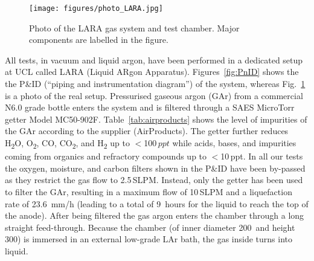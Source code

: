 \documentclass[a4paper,11pt]{article}
\begin{document}
\begin{figure}[tb]
	\begin{center}
	\texttt{[image: figures/photo\_LARA.jpg]}			
	\caption{Photo of the LARA gas system and test chamber. Major components are labelled in the figure.}
	\label{fig:photo_LARA}
	\end{center}
\end{figure}

All tests, in vacuum and liquid argon, have been performed in a dedicated setup at UCL called LARA (Liquid ARgon Apparatus).
Figures~\ref{fig:PnID} shows the the P\&ID (``piping and instrumentation diagram'') of the system, whereas Fig.~\ref{fig:photo_LARA} is a photo of the real setup. Pressurised gaseous argon (GAr) from a commercial N6.0 grade bottle enters the system and is filtered through a SAES MicroTorr getter Model MC50-902F. Table~\ref{tab:airproducts} shows the level of impurities of the GAr according to the supplier (AirProducts). The getter further reduces H\textsubscript{2}O, O\textsubscript{2}, CO, CO\textsubscript{2}, and H\textsubscript{2} up to $<$100\,$ppt$ while acids, bases, and impurities coming from organics and refractory compounds up to $<$10\,ppt. In all our tests the oxygen, moisture, and carbon filters shown in the P\&ID have been by-passed as they restrict the gas flow to 2.5\,SLPM. Instead, only the getter has been used to filter the GAr, resulting in a maximum flow of 10\,SLPM and a liquefaction rate of \SI{23.6}{mm/h} (leading to a total of \SI{9}{hours} for the liquid to reach the top of the anode).
After being filtered the gas argon enters the chamber through a long straight feed-through. Because the chamber (of inner diameter 200\mm\ and height 300\mm) is immersed in an external low-grade LAr bath, the gas inside turns into liquid. 
\end{document}
